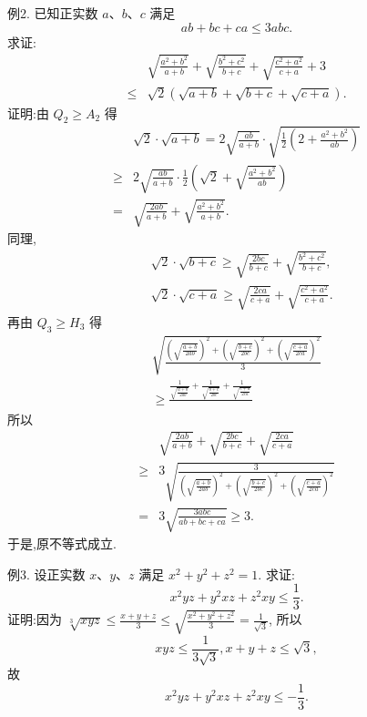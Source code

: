例2. 已知正实数 $a 、 b 、 c$ 满足
$$
a b+b c+c a \leqslant 3 a b c .
$$
求证:
$$
\begin{aligned}
& \sqrt{\frac{a^2+b^2}{a+b}}+\sqrt{\frac{b^2+c^2}{b+c}}+\sqrt{\frac{c^2+a^2}{c+a}}+3 \\
\leqslant & \sqrt{2}(\sqrt{a+b}+\sqrt{b+c}+\sqrt{c+a}) .
\end{aligned}
$$
证明:由 $Q_2 \geqslant A_2$ 得
$$
\begin{aligned}
& \sqrt{2} \cdot \sqrt{a+b}=2 \sqrt{\frac{a b}{a+b}} \cdot \sqrt{\frac{1}{2}\left(2+\frac{a^2+b^2}{a b}\right)} \\
\geqslant & 2 \sqrt{\frac{a b}{a+b}} \cdot \frac{1}{2}\left(\sqrt{2}+\sqrt{\frac{a^2+b^2}{a b}}\right) \\
= & \sqrt{\frac{2 a b}{a+b}}+\sqrt{\frac{a^2+b^2}{a+b}} .
\end{aligned}
$$
同理,
$$
\begin{aligned}
& \sqrt{2} \cdot \sqrt{b+c} \geqslant \sqrt{\frac{2 b c}{b+c}}+\sqrt{\frac{b^2+c^2}{b+c}}, \\
& \sqrt{2} \cdot \sqrt{c+a} \geqslant \sqrt{\frac{2 c a}{c+a}}+\sqrt{\frac{c^2+a^2}{c+a}} .
\end{aligned}
$$
再由 $Q_3 \geqslant H_3$ 得
$$
\begin{gathered}
\sqrt{\frac{\left(\sqrt{\frac{a+b}{2 a b}}\right)^2+\left(\sqrt{\frac{b+c}{2 b c}}\right)^2+\left(\sqrt{\frac{c+a}{2 c a}}\right)^2}{3}} \\
\geqslant \frac{\frac{1}{\sqrt{\frac{a+b}{2 a b}}}+\frac{1}{\sqrt{\frac{b+c}{2 b c}}}+\frac{1}{\sqrt{\frac{c+a}{2 c a}}}}{}
\end{gathered}
$$
所以
$$
\begin{aligned}
& \sqrt{\frac{2 a b}{a+b}}+\sqrt{\frac{2 b c}{b+c}}+\sqrt{\frac{2 c a}{c+a}} \\
\geqslant & 3 \sqrt{\frac{3}{\left(\sqrt{\frac{a+b}{2 a b}}\right)^2+\left(\sqrt{\frac{b+c}{2 b c}}\right)^2+\left(\sqrt{\frac{c+a}{2 c a}}\right)^2}} \\
= & 3 \sqrt{\frac{3 a b c}{a b+b c+c a}} \geqslant 3 .
\end{aligned}
$$
于是,原不等式成立.



例3. 设正实数 $x 、 y 、 z$ 满足 $x^2+y^2+z^2=1$. 求证:
$$
x^2 y z+y^2 x z+z^2 x y \leqslant \frac{1}{3} .
$$
证明:因为 $\sqrt[3]{x y z} \leqslant \frac{x+y+z}{3} \leqslant \sqrt{\frac{x^2+y^2+z^2}{3}}=\frac{1}{\sqrt{3}}$, 所以
$$
x y z \leqslant \frac{1}{3 \sqrt{3}}, x+y+z \leqslant \sqrt{3},
$$
故
$$
x^2 y z+y^2 x z+z^2 x y \leqslant-\frac{1}{3} .
$$



